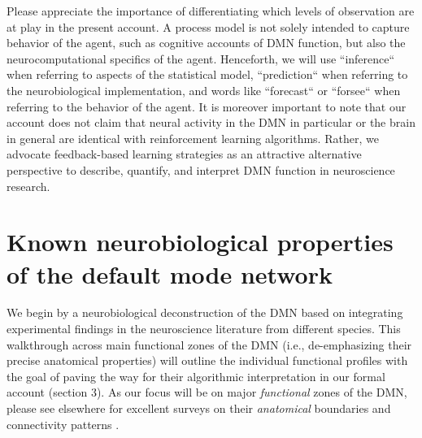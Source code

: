 \documentclass[10pt,letterpaper]{article}
\begin{document}
Please appreciate the importance of differentiating which levels of observation are at play in the present account. A process model is not solely intended to capture behavior of the agent, such as cognitive accounts of DMN function, but also the neurocomputational specifics of the agent. Henceforth, we will use ``inference`` when referring to aspects of the statistical model, ``prediction`` when referring to the neurobiological implementation, and words like ``forecast`` or ``forsee`` when referring to the behavior of the agent.
%
It is moreover important to note that
our account does not claim that neural activity in the DMN in particular
or the brain in general are identical with reinforcement learning algorithms.
Rather, we advocate feedback-based learning strategies as an attractive alternative perspective
to describe, quantify, and interpret DMN function in neuroscience research.



\section{Known neurobiological properties of the default mode network}
\label{sec:nodes}
We begin by a neurobiological deconstruction of the DMN
based on integrating experimental findings in the neuroscience literature
from different species.
This walkthrough across main functional zones of the DMN
(i.e., de-emphasizing their precise anatomical properties)
will outline the individual functional profiles with the goal of
paving the way for their algorithmic interpretation
in our formal account (section 3).
As our focus will be on major \textit{functional} zones of the DMN,
please see elsewhere for excellent surveys on their \textit{anatomical}
boundaries and connectivity patterns \citep{randy2008, binder2009, seghier2013angular}.
\end{document}
